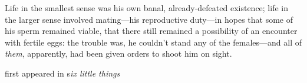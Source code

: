 Life in the smallest sense was his own banal, already-defeated
existence; life in the larger sense involved mating---his reproductive
duty---in hopes that some of his sperm remained viable, that there still
remained a possibility of an encounter with fertile eggs: the trouble
was, he couldn't stand any of the females---and all of \emph{them},
apparently, had been given orders to shoot him on sight.

first appeared in s\emph{ix little things}
